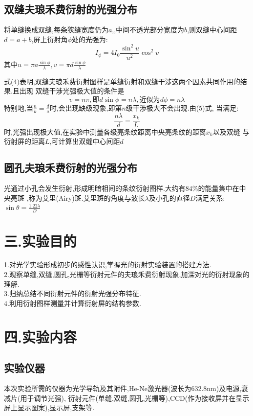 \documentclass[12pt,a4paper,oneside]{ctexart}
\begin{document}
\subsection*{双缝夫琅禾费衍射的光强分布}\par
将单缝换成双缝,每条狭缝宽度仍为$a$,,中间不透光部分宽度为$b$,则双缝中心间距
$d=a+b$,屏上衍射角$\phi$处的光强为:
\begin{equation}
    I_{\phi}=4I_0\frac{\sin^2u}{u^2}\cos^2v
\end{equation}
其中$u=\pi a\frac{\sin \phi}{\lambda},v=\pi d\frac{\sin\phi}{\lambda}$ \par
式(4)表明,双缝夫琅禾费衍射图样是单缝衍射和双缝干涉这两个因素共同作用的结果.且出现
双缝干涉光强极大值的条件是
\begin{equation}
    v=n\pi,\mbox{即}d\sin\phi=n\lambda,\mbox{近似为}d\phi=n\lambda
\end{equation}
特别地,当$\frac{n}{k}=\frac{d}{a}$时,会出现缺级现象,即第$n$级干涉极大不会出现.由(5)式,
当满足:
\begin{equation}
    \frac{n\lambda}{d}=\frac{x_k}{L}
\end{equation}
时,光强出现极大值,在实验中测量各级亮条纹距离中央亮条纹的距离$x_k$以及双缝
与衍射屏的距离$L$,可计算出双缝中心间距$d$\\

\subsection*{圆孔夫琅禾费衍射的光强分布}\par
光通过小孔会发生衍射,形成明暗相间的条纹衍射图样.大约有$84\%$的能量集中在中央亮斑
,称为艾里(Airy)斑.艾里斑的角度与波长$\lambda$及小孔的直径$D$满足关系:
$\sin\theta=\frac{1.22\lambda}{D}$
\section{三.实验目的}
\noindent
1.对光学实验形成初步的感性认识,掌握光的衍射实验装置的搭建方法.\\
2.观察单缝,双缝,圆孔,光栅等衍射元件的夫琅禾费衍射现象,加深对光的衍射现象的理解.\\
3.归纳总结不同衍射元件的衍射光强分布特征.\\
4.利用衍射图样测量并计算衍射屏的结构参数.\\
\section{四.实验内容}
\subsection*{实验仪器}
本次实验所需的仪器为光学导轨及其附件,He-Ne激光器(波长为632.8nm)及电源,衰减片(用于调节光强),
衍射元件(单缝,双缝,圆孔,光栅等),CCD(作为接收屏并在显示屏上显示图案),显示屏,支架等.
\end{document}
